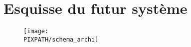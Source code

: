 \section{Esquisse du futur système}

\begin{figure}[!h]
\begin{center}
    \texttt{[image: \\PIXPATH/schema\_archi]}
\end{center}
\end{figure}
\vfill
\pagebreak

%
